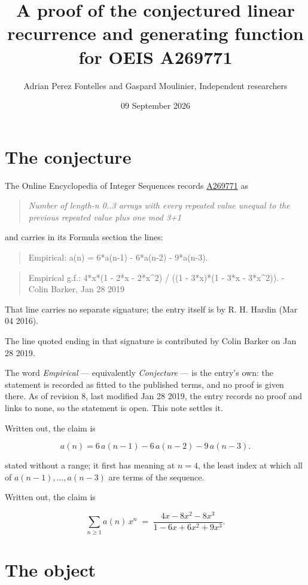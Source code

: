 \documentclass[11pt]{article}
\title{A proof of the conjectured linear recurrence and generating function for OEIS A269771}
\author{Adrian Perez Fontelles and Gaspard Moulinier, Independent researchers}
\date{09 September 2026}
\theoremstyle{definition}
\begin{document}
\maketitle
\section{The conjecture}

The Online Encyclopedia of Integer Sequences records \href{https://oeis.org/A269771}{A269771} as

\begin{quote}\itshape Number of length-n 0..3 arrays with every repeated value unequal to the previous repeated value plus one mod 3+1\end{quote}

and carries in its Formula section the lines:

\begin{quote}\ttfamily Empirical: a(n) = 6*a(n-1) - 6*a(n-2) - 9*a(n-3).\end{quote}

\begin{quote}\ttfamily Empirical g.f.: 4*x*(1 - 2*x - 2*x\textasciicircum{}2) / ((1 - 3*x)*(1 - 3*x - 3*x\textasciicircum{}2)). - Colin Barker, Jan 28 2019\end{quote}

That line carries no separate signature; the entry itself is by R. H. Hardin (Mar 04 2016).

The line quoted ending in that signature is contributed by Colin Barker on Jan 28 2019.

The word {\itshape Empirical} --- equivalently {\itshape Conjecture} --- is the entry's own: the statement is recorded as fitted to the published terms, and no proof is given there. As of revision 8, last modified Jan 28 2019, the entry records no proof and links to none, so the statement is open. This note settles it.

Written out, the claim is

\[a(n) = 6\,a(n-1) - 6\,a(n-2) - 9\,a(n-3).\]

stated without a range; it first has meaning at $n = 4$, the least index at which all of $a(n-1),\dots,a(n-3)$ are terms of the sequence.

Written out, the claim is

\[\sum_{n \ge 1} a(n)\,x^n \;=\; \frac{4x - 8x^{2} - 8x^{3}}{1 - 6x + 6x^{2} + 9x^{3}}.\]

\section{The object}
\end{document}
